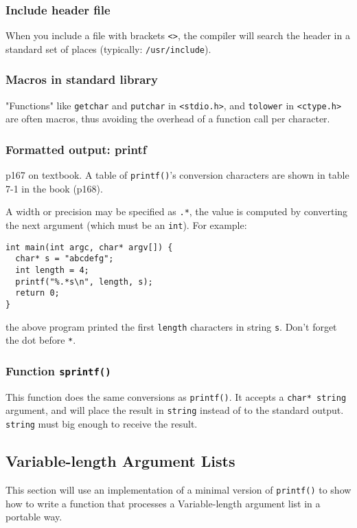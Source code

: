 \documentclass[12pt]{article}
\begin{document}
\subsubsection{Include header file}
\label{sec:org07a25df}
When you include a file with brackets \texttt{<>}, the compiler will search the header in a standard set of places (typically: \texttt{/usr/include}).

\subsubsection{Macros in standard library}
\label{sec:orge71c186}
"Functions" like \texttt{getchar} and \texttt{putchar} in \texttt{<stdio.h>}, and \texttt{tolower} in \texttt{<ctype.h>} are often macros, thus avoiding the overhead of a function call per character.

\subsubsection{Formatted output: printf}
\label{sec:org4f50d30}
p167 on textbook. A table of \texttt{printf()}'s conversion characters are shown in table 7-1 in the book (p168).

A width or precision may be specified as \texttt{.*}, the value is computed by converting the next argument (which must be an \texttt{int}). For example:
\begin{verbatim}
int main(int argc, char* argv[]) {
  char* s = "abcdefg";
  int length = 4;
  printf("%.*s\n", length, s);
  return 0;
}
\end{verbatim}
the above program printed the first \texttt{length} characters in string \texttt{s}. Don't forget the dot before \texttt{*}.

\subsubsection{Function \texttt{sprintf()}}
\label{sec:org0429fe9}
This function does the same conversions as \texttt{printf()}. It accepts a \texttt{char* string} argument, and will place the result in \texttt{string} instead of to the standard output. \texttt{string} must big enough to receive the result.

\subsection{Variable-length Argument Lists}
\label{sec:org3457708}
This section will use an implementation of a minimal version of \texttt{printf()} to show how to write a function that processes a Variable-length argument list in a portable way.
\end{document}
